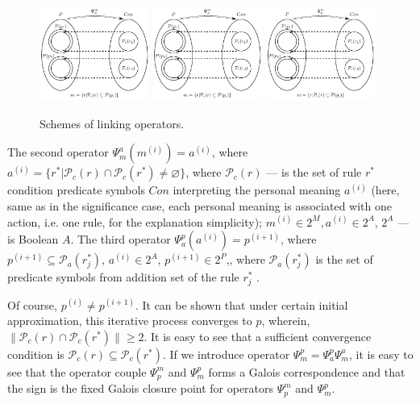 \documentclass[review]{elsarticle}
\begin{document}
\begin{figure}[H]
	\label{fig:linkers}
	\centering
	\includegraphics[width=0.32\textwidth,page=1]{sign-schemas/oper_relat}
	\includegraphics[width=0.32\textwidth,page=2]{sign-schemas/oper_relat}
	\includegraphics[width=0.32\textwidth,page=3]{sign-schemas/oper_relat}
	\caption{Schemes of linking operators.}		
\end{figure}

The second operator $\Psi_m^a(m^{(i)})=a^{(i)}$, where  $a^{(i)}=\{r^*|\mathcal{P}_c(r)\cap \mathcal{P}_c(r^*)\not=\varnothing\}$, where $\mathcal{P}_c(r)$ --- is the set of rule $r^*$ condition predicate symbols $Con$ interpreting the personal meaning $a^{(i)}$ (here, same as in the significance case, each personal meaning is associated with one action, i.e. one rule, for the explanation simplicity); $m^{(i)}\in 2^M, a^{(i)}\in 2^A$, $2^A$ --- is Boolean $A$. The third operator $\Psi_a^p(a^{(i)})=p^{(i+1)}$, where $p^{(i+1)}\subseteq \mathcal{P}_a(r_j^*)$, $a^{(i)}\in 2^A$, $p^{(i+1)}\in 2^P$,, where $\mathcal{P}_a(r_j^*)$ is the set of predicate symbols from addition set of the rule $r_j^*$ .

Of course, $p^{(i)}\not = p^{(i+1)}$. It can be shown that under certain initial approximation, this iterative process converges to $p$, wherein, $\|\mathcal P_c(r)\cap\mathcal P_c(r^*)\|\geq 2$. It is easy to see that a sufficient convergence condition is $\mathcal P_c(r)\subseteq\mathcal P_c(r^*)$. If we introduce operator $\Psi_m^p=\Psi_a^p\Psi_m^a$, it is easy to see that the operator couple $\Psi_p^m$ and $\Psi_m^p$ forms a Galois correspondence and that the sign is the fixed Galois closure point for operators $\Psi_p^m$ and $\Psi_m^p$.
\end{document}
